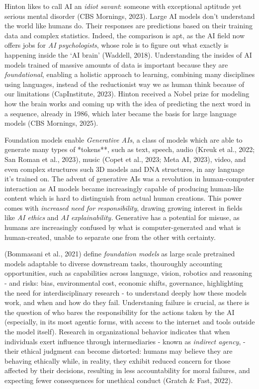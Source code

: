 \documentclass[
  12pt,
  letterpaper,
  DIV=11,
  numbers=noendperiod]{scrartcl}
\begin{document}
Hinton likes to call AI an \emph{idiot savant}: someone with exceptional
aptitude yet serious mental disorder (CBS Mornings, 2023). Large AI
models don't understand the world like humans do. Their responses are
predictions based on their training data and complex statistics. Indeed,
the comparison is apt, as the AI field now offers jobs for \emph{AI
psychologists}, whose role is to figure out what exactly is happening
inside the `AI brain' (Waddell, 2018). Understanding the insides of AI
models trained of massive amounts of data is important because they are
\emph{foundational}, enabling a holistic approach to learning, combining
many disciplines using languages, instead of the reductionist way we as
human think because of our limitations (CapInstitute, 2023). Hinton
received a Nobel prize for modeling how the brain works and coming up
with the idea of predicting the next word in a sequence, already in
1986, which later became the basis for large language models (CBS
Mornings, 2025).

Foundation models enable \emph{Generative AIs}, a class of models which
are able to generate many types of *tokens**, such as text, speech,
audio (Kreuk et al., 2022; San Roman et al., 2023), music (Copet et al.,
2023; Meta AI, 2023), video, and even complex structures such 3D models
and DNA structures, in any language it's trained on. The advent of
generative AIs was a revolution in human-computer interaction as AI
models became increasingly capable of producing human-like content which
is hard to distinguish from actual human creations. This power comes
with \emph{increased need for responsibility}, drawing growing interest
in fields like \emph{AI ethics} and \emph{AI explainability.} Generative
has a potential for misuse, as humans are increasingly confused by what
is computer-generated and what is human-created, unable to separate one
from the other with certainty.

(Bommasani et al., 2021) define \emph{foundation models} as large scale
pretrained models adaptable to diverse downstream tasks, thouroughly
accounting opportunities, such as capabilities across language, vision,
robotics and reasoning - and risks: bias, environmental cost, economic
shifts, governance, highlighting the need for interdisciplinary research
- to understand deeply how these models work, and when and how do they
fail. Understaning failure is crucial, as there is the question of who
bares the responsibility for the actions taken by the AI (especially, in
its most agentic forms, with access to the internet and tools outside
the model itself). Research in organizational behavior indicates that
when individuals exert influence through intermediaries - known as
\emph{indirect agency}, - their ethical judgment can become distorted:
humans may believe they are behaving ethically while, in reality, they
exhibit reduced concern for those affected by their decisions, resulting
in less accountability for moral failures, and expecting fewer
consequences for unethical conduct (Gratch \& Fast, 2022).
\end{document}
